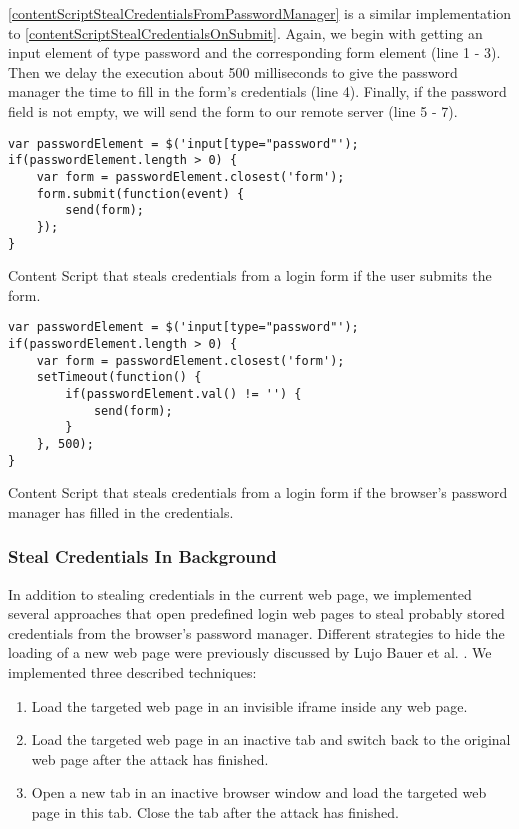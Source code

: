 	\autoref{contentScriptStealCredentialsFromPasswordManager} is a similar implementation to \autoref{contentScriptStealCredentialsOnSubmit}. Again, we begin with getting an input element of type password and the corresponding form element (line 1 - 3). Then we delay the execution about 500 milliseconds to give the password manager the time to fill in the form's credentials (line 4). Finally, if the password field is not empty, we will send the form to our remote server (line 5 - 7).
	
	\begin{code}
		\begin{lstlisting}	
var passwordElement = $('input[type="password"');
if(passwordElement.length > 0) {
	var form = passwordElement.closest('form');
	form.submit(function(event) {
		send(form);
	});
}
\end{lstlisting}
		\caption{Content Script that steals credentials from a login form if the user submits the form.}
		\label{contentScriptStealCredentialsOnSubmit}
	\end{code}
	
	\begin{code}
		\begin{lstlisting}
var passwordElement = $('input[type="password"');
if(passwordElement.length > 0) {
	var form = passwordElement.closest('form');
	setTimeout(function() {
		if(passwordElement.val() != '') {
			send(form);
		}
	}, 500);
}
\end{lstlisting}
		\caption{Content Script that steals credentials from a login form if the browser's password manager has filled in the credentials.}
		\label{contentScriptStealCredentialsFromPasswordManager}
	\end{code}
	
\subsubsection{Steal Credentials In Background}

	In addition to stealing credentials in the current web page, we implemented several approaches that open predefined login web pages to steal probably stored credentials from the browser's password manager. Different strategies to hide the loading of a new web page were previously discussed by Lujo Bauer et al. \cite{extensions:cns14}. We implemented three described techniques:
	
	\begin{enumerate}
		\item Load the targeted web page in an invisible iframe inside any web page.
		\item Load the targeted web page in an inactive tab and switch back to the original web page after the attack has finished.
		\item Open a new tab in an inactive browser window and load the targeted web page in this tab. Close the tab after the attack has finished.
	\end{enumerate} 
	
